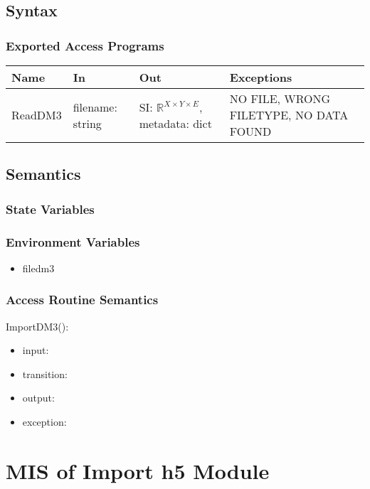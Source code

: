 \documentclass[12pt, titlepage]{article}
\begin{document}
\subsection{Syntax}

\subsubsection{Exported Access Programs}

\begin{center}
\begin{tabular}{p{2cm} p{4cm} p{4cm} p{4cm}}
\hline
\textbf{Name} & \textbf{In} & \textbf{Out} & \textbf{Exceptions} \\
\hline
ReadDM3 & filename: string & SI: $\mathbb{R}^{X \times Y \times E}$, metadata: dict & NO FILE, WRONG FILETYPE, NO DATA FOUND  \\
\hline
\end{tabular}
\end{center}

\subsection{Semantics}

\subsubsection{State Variables}

\subsubsection{Environment Variables}
\begin{itemize}
\item filedm3
\end{itemize}
\subsubsection{Access Routine Semantics}

\noindent ImportDM3():
\begin{itemize}
\item input: 
\item transition:
\item output: 
\item exception: 
\end{itemize}

\section{MIS of Import h5 Module} \label{Mod:ImportH5} 
\end{document}
